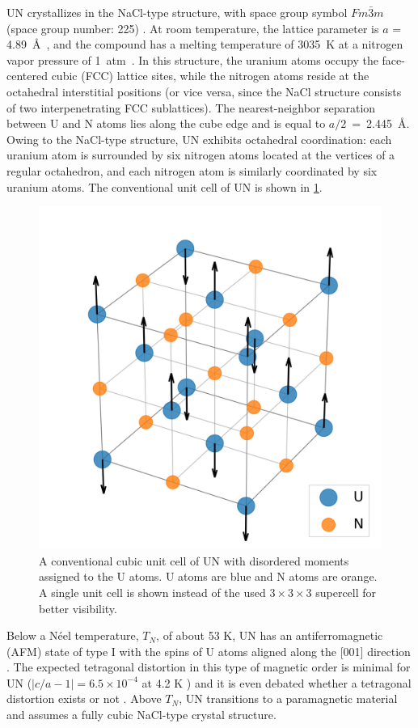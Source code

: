 \documentclass[preprint, 12pt]{elsarticle}
\newcommand{\?}{\stackrel{?}{=}}
\begin{document}

UN crystallizes in the NaCl-type structure, with space group symbol $Fm\bar{3}m$ (space group number: 225) \cite{AFLOW}. At room temperature, the lattice parameter is $a$ = 4.89~{\AA}~\cite{Hayes1990I}, and the compound has a melting temperature of 3035~K at a nitrogen vapor pressure of 1~atm~\cite{Hayes1990IV}. In this structure, the uranium atoms occupy the face-centered cubic (FCC) lattice sites, while the nitrogen atoms reside at the octahedral interstitial positions (or vice versa, since the NaCl structure consists of two interpenetrating FCC sublattices). The nearest-neighbor separation between U and N atoms lies along the cube edge and is equal to $a/2$~=~2.445~{\AA}. Owing to the NaCl-type structure, UN exhibits octahedral coordination: each uranium atom is surrounded by six nitrogen atoms located at the vertices of a regular octahedron, and each nitrogen atom is similarly coordinated by six uranium atoms. The conventional unit cell of UN is shown in \cref{Fig:UnitCell}.

\begin{figure}[h]
    \centering
    \includegraphics[width=0.5\linewidth]{UN-DLM.png}
    \caption{A conventional cubic unit cell of UN with disordered moments assigned to the U atoms. U atoms are blue and N atoms are orange. A single unit cell is shown instead of the used $3 \times 3 \times 3$ supercell for better visibility.}
    \label{Fig:UnitCell}
\end{figure}

Below a Néel temperature, $T_N$, of about 53 K, UN has an antiferromagnetic (AFM) state of type I with the spins of U atoms aligned along the [001] direction \cite{Curry1965}. The expected tetragonal distortion in this type of magnetic order is minimal for UN ($|c/a-1| = 6.5 \times 10^{-4}$ at 4.2 K \cite{Samsel2007}) and it is even debated whether a tetragonal distortion exists or not \cite{Samsel2007}. Above $T_N$, UN transitions to a paramagnetic material and assumes a fully cubic NaCl-type crystal structure.
\end{document}
